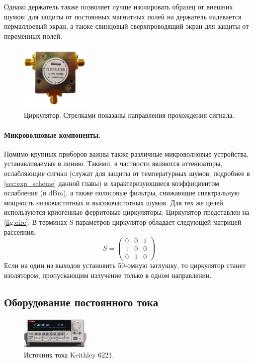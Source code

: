 \documentclass[12pt, twoside]{report}
\newcommand{\rbrkt}[1]{\left( #1 \right)}
\numberwithin{equation}{section}
\numberwithin{figure}{section}
\begin{document}
Однако держатель также позволяет лучше изолировать образец от внешних шумов: для защиты от постоянных магнитных полей на держатель надевается пермаллоевый экран, а также свинцовый сверхпроводящий экран для защиты от переменных полей.


\begin{figure}
\centering
\includegraphics[width=0.3\textwidth]{Pictures/circ}
\caption{Циркулятор. Стрелками показаны направления прохождения сигнала.}
\label{fig:circ}
\end{figure}

\paragraph{Микроволновые компоненты.} Помимо крупных приборов важны также различные микроволновые устройства, устанавливаемые в линию. Такими, в частности являются аттенюаторы, ослабляющие сигнал (служат для защиты от температурных шумов, подробнее в \autoref{sec:exp_scheme} данной главы) и характеризующиеся коэффициентом ослабления (в dBm), а также полосовые фильтры, снижающие спектральную мощность низкочастотных и высокочастотных шумов. Для тех же целей используются криогенные ферритовые циркуляторы. Циркулятор представлен на \autoref{fig:circ}. В терминах S-параметров циркулятор обладает следующей матрицей рассеяния:
\begin{equation*}
S = \rbrkt{\begin{matrix}
0 & 0 & 1 \\
1 &0 & 0\\
0&1&0
\end{matrix}}
\end{equation*}
Если на один из выходов установить 50-омную заглушку, то циркулятор станет изолятором, пропускающим излучение только в одном направлении.

\subsection{Оборудование постоянного тока}

\begin{figure}
\centering
\includegraphics[width=0.3\textwidth]{Pictures/6221}
\caption{Источник тока Keithley 6221.}
\label{fig:6221}
\end{figure}
\end{document}
